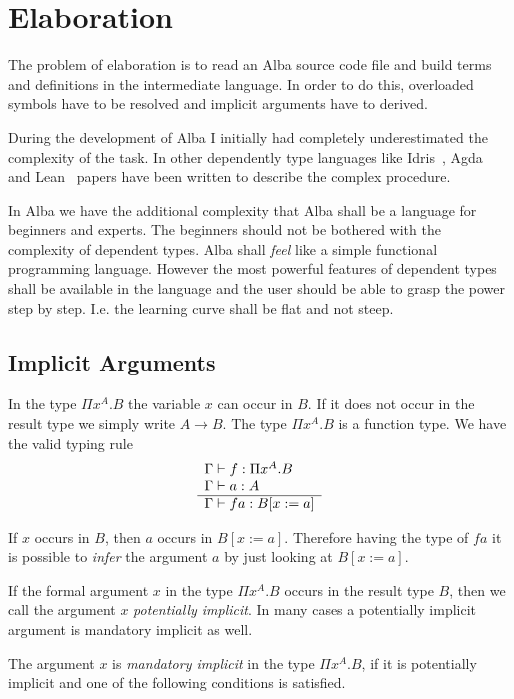 \chapter{Elaboration}

The problem of elaboration is to read an Alba source code file and build terms
and definitions in the intermediate language. In order to do this, overloaded
symbols have to be resolved and implicit arguments have to derived.

During the development of Alba I initially had completely underestimated the
complexity of the task. In other dependently type languages like
Idris~\cite{brady2013}, Agda~\cite{norell2007} and Lean~\cite{demoura2015} papers
have been written to describe the complex procedure.

In Alba we have the additional complexity that Alba shall be a language for
beginners and experts. The beginners should not be bothered with the complexity
of dependent types. Alba shall \emph{feel} like a simple functional programming
language. However the most powerful features of dependent types shall be
available in the language and the user should be able to grasp the power step by
step. I.e. the learning curve shall be flat and not steep.



\section{Implicit Arguments}


In the type $\Pi x^A. B$ the variable $x$ can occur in $B$. If it does not occur
in the result type we simply write $A \to B$. The type $\Pi x^A. B$ is a
function type. We have the valid typing rule
$$
\rulev{
    \Gamma \vdash f: \Pi x^A. B

    \\

    \Gamma \vdash a: A
}
{
    \Gamma \vdash f a: B[x:= a]
}
$$

If $x$ occurs in $B$, then $a$ occurs in $B[x:=a]$. Therefore having the type of
$f a$ it is possible to \emph{infer} the argument $a$ by just looking at
$B[x:=a]$.


If the formal argument $x$ in the type $\Pi x^A. B$ occurs in the result type
$B$, then we call the argument $x$ \emph{potentially implicit}. In many cases a
potentially implicit argument is mandatory implicit as well.

The argument $x$ is \emph{mandatory implicit} in the type $\Pi x^A. B$, if it is
potentially implicit and one of the following conditions is satisfied.

